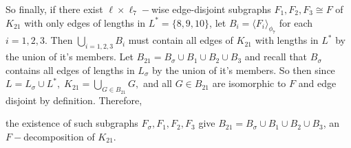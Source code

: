 \begin{construction}
    So finally, if there exist $\ell\times \ell_{7}-$wise edge-disjoint subgraphs $F_{1},F_{2},F_{3}\cong F$ of $K_{21}$ with only edges of lengths in $L^{*}=\{8,9,10\}$, let $B_{i}=\langle F_{i}\rangle_{\phi_{7}}$ for each $i=1,2,3$. Then $\bigcup_{i=1,2,3}B_{i}$ must contain all edges of $K_{21}$ with lengths in $L^{*}$ by the union of it's members. Let $B_{21}=B_{\sigma}\cup B_{1}\cup B_{2}\cup B_{3}$ and recall that $B_{\sigma}$ contains all edges of lengths in $L_{\sigma}$ by the union of it's members. So then since $L=L_{\sigma}\cup L^{*},\;K_{21}=\bigcup_{G\in B_{21}}G,$ and all $G\in B_{21}$ are isomorphic to $F$ and edge disjoint by definition. Therefore,
    \begin{center}
    the existence of such subgraphs $F_{\sigma},F_{1},F_{2},F_{3}$ give $B_{21}=B_{\sigma}\cup B_{1}\cup B_{2}\cup B_{3}$, an $F-$decomposition of $K_{21}.$
    \end{center}
\end{construction}

